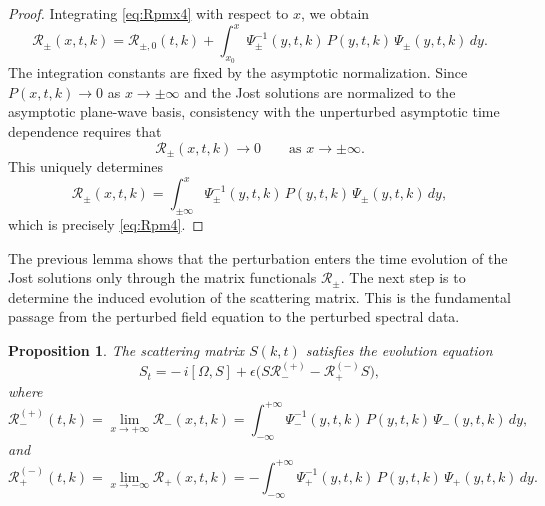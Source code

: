 \documentclass[11pt]{amsart}
\newtheorem{proposition}{Proposition}[section]
\theoremstyle{definition}
\numberwithin{equation}{section}
\begin{document}
\begin{proof}
Integrating \eqref{eq:Rpmx4} with respect to $x$, we obtain
\[
\mathcal{R}_\pm(x,t,k)=\mathcal{R}_{\pm,0}(t,k)+\int_{x_0}^{x}\Psi_\pm^{-1}(y,t,k)\,P(y,t,k)\,\Psi_\pm(y,t,k)\,dy.
\]
The integration constants are fixed by the asymptotic normalization. Since $P(x,t,k)\to 0$ as $x\to\pm\infty$ and the Jost solutions are normalized to the asymptotic plane-wave basis, consistency with the unperturbed asymptotic time dependence requires that
\[
\mathcal{R}_\pm(x,t,k)\to 0
\qquad\text{as }x\to\pm\infty.
\]
This uniquely determines
\[
\mathcal{R}_\pm(x,t,k)=\int_{\pm\infty}^{x}\Psi_\pm^{-1}(y,t,k)\,P(y,t,k)\,\Psi_\pm(y,t,k)\,dy,
\]
which is precisely \eqref{eq:Rpm4}.
\end{proof}

The previous lemma shows that the perturbation enters the time evolution of the Jost solutions only through the matrix functionals $\mathcal{R}_\pm$. The next step is to determine the induced evolution of the scattering matrix. This is the fundamental passage from the perturbed field equation to the perturbed spectral data.

\begin{proposition}
The scattering matrix $S(k,t)$ satisfies the evolution equation
\begin{equation}
S_t = -\,i[\Omega,S] + \epsilon\bigl(S\mathcal{R}_-^{(+)} - \mathcal{R}_+^{(-)}S\bigr),
\label{eq:ScatteringEvolution4}
\end{equation}
where
\begin{equation}
\mathcal{R}_-^{(+)}(t,k)=\lim_{x\to+\infty}\mathcal{R}_-(x,t,k)=\int_{-\infty}^{+\infty}\Psi_-^{-1}(y,t,k)\,P(y,t,k)\,\Psi_-(y,t,k)\,dy,
\label{eq:Rminusplus4}
\end{equation}
and
\begin{equation}
\mathcal{R}_+^{(-)}(t,k)=\lim_{x\to-\infty}\mathcal{R}_+(x,t,k)=-\int_{-\infty}^{+\infty}\Psi_+^{-1}(y,t,k)\,P(y,t,k)\,\Psi_+(y,t,k)\,dy.
\label{eq:Rplusminus4}
\end{equation}
\end{proposition}
\end{document}
